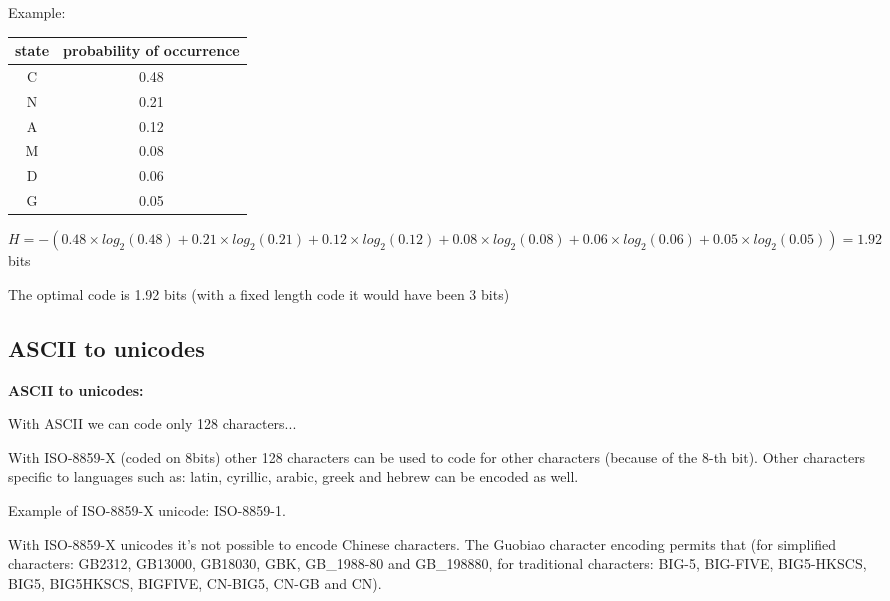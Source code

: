 \documentclass{beamer}[10pt, usepdftitle=false, handout]
\begin{document}
	\begin{frame}	
	
	Example:
		\vspace*{1em}	
	
	\begin{tabular}{|c|c|} 
	\hline
	\textbf{state} & \textbf{probability of occurrence} \\ \hline
	C & 0.48 \\ \hline
	N & 0.21 \\ \hline
	A & 0.12 \\ \hline
	M & 0.08 \\ \hline
	D & 0.06 \\ \hline
	G & 0.05 \\ \hline
	\end{tabular}	
		\vspace*{1em}	
		
	$H=-(0.48\times log_2(0.48) + 0.21\times log_2(0.21) + 0.12\times log_2(0.12) + 0.08\times log_2(0.08) + 0.06\times log_2(0.06) + 0.05\times log_2(0.05))=1.92$ bits
		\vspace*{1em}	
	
	The optimal code is 1.92 bits (with a fixed length code it would have been 3 bits)	
	
	
	\end{frame}

	\subsection{ASCII to unicodes}

	\begin{frame}
	
	\textbf{ASCII to unicodes:}
		\vspace*{1em}	
	
	With ASCII we can code only 128 characters...
		\vspace*{0.5em}	
	
	With ISO-8859-X (coded on 8bits) other 128 characters can be used to code for other characters (because of the 8-th bit). Other characters specific to languages such as: latin, cyrillic, arabic, greek and hebrew can be encoded as well. 
	\vspace*{0.5em}		
		
	Example of ISO-8859-X unicode: ISO-8859-1.
	\vspace*{0.5em}	
	
	With ISO-8859-X unicodes it's not possible to encode Chinese characters. The Guobiao character encoding permits that (for simplified characters: GB2312, GB13000, GB18030, GBK, GB\_1988-80 and GB\_198880, for traditional characters:  BIG-5, BIG-FIVE, BIG5-HKSCS, BIG5, BIG5HKSCS, BIGFIVE, CN-BIG5, CN-GB and CN).		
		
	
	\end{frame}
\end{document}
